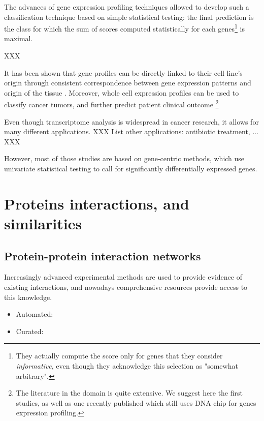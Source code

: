 	The advances of gene expression profiling techniques allowed \textcite{golub1999molecular} to develop such a classification technique based on simple statistical testing: the final prediction is the class for which the sum of scores computed statistically for each genes\footnote{They actually compute the score only for genes that they consider \emph{informative}, even though they acknowledge this selection as "somewhat arbitrary".} is maximal.

	XXX

	It has been shown that gene profiles can be directly linked to their cell line's origin through consistent correspondence between gene expression patterns and origin of the tissue \parencite{ross2000systematic}.
	Moreover, whole cell expression profiles can be used to classify cancer tumors, and further predict patient clinical outcome \parencites{perou2000molecular}{sorlie2001gene}{vantveer2002gene}{vijver2002gene}{estevez2015gene}\footnote{The literature in the domain is quite extensive. We suggest here the first studies, as well as one recently published which still uses DNA chip for genes expression profiling.}

	Even though transcriptome analysis is widespread in cancer research, it allows for many different applications. XXX List other applications: antibiotic treatment, ... XXX

	However, most of those studies are based on gene-centric methods, which use univariate statistical testing to call for significantly differentially expressed genes.

\section{Proteins interactions, and similarities}

	\subsection{Protein-protein interaction networks}

	Increasingly advanced experimental methods are used to provide evidence of existing interactions, and nowadays comprehensive resources provide access to this knowledge.

	\begin{itemize}
		\item Automated: \parencite{szklarczyk2014string}
		\item Curated: \parencite{orchard2012protein}
	\end{itemize}

